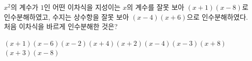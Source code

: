 $x^2$의 계수가 $1$인 어떤 이차식을 지성이는 $x$의 계수를 잘못 보아 $(x+1)(x-8)$로 인수분해하였고, 수지는 상수항을 잘못 보아 $(x-4)(x+6)$으로 인수분해하였다. 처음 이차식을 바르게 인수분해한 것은?
\begin{choicesii}{$(x+1)(x-6)$}{$(x-2)(x+4)$}{$(x+2)(x-4)$}{$(x-3)(x+8)$}{$(x+3)(x-8)$}\end{choicesii}
